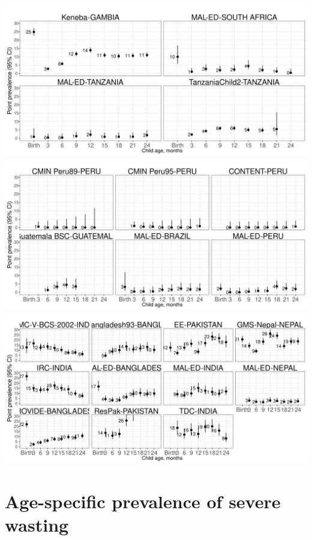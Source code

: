 \documentclass[
  9pt,
]{book}
\begin{document}
\includegraphics[width=41.67in]{figures//wasting/fig-prev_plot_africa}
\includegraphics[width=41.67in]{figures//wasting/fig-prev_plot_lam}
\includegraphics[width=41.67in]{figures//wasting/fig-prev_plot_sasia}

\hypertarget{age-specific-prevalence-of-severe-wasting-1}{%
\section{Age-specific prevalence of severe wasting}\label{age-specific-prevalence-of-severe-wasting-1}}
\end{document}
